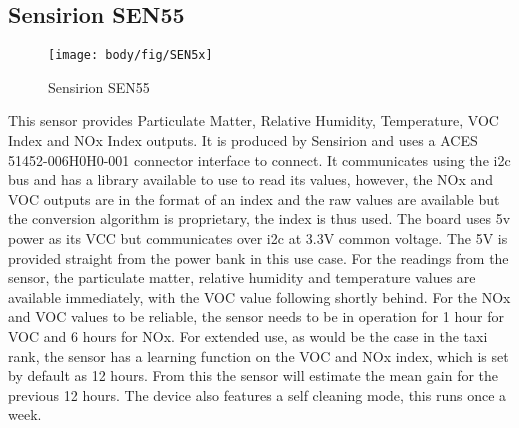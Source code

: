 \subsection{Sensirion SEN55}
\begin{figure}[!htb]
	\centering
	\texttt{[image: body/fig/SEN5x]}
	\caption{Sensirion SEN55}
	\label{fig:sen5x}
\end{figure}
\noindent
This sensor provides Particulate Matter, Relative Humidity, Temperature, VOC Index and NOx Index outputs.
It is produced by Sensirion and uses a ACES 51452-006H0H0-001 connector interface to connect. It communicates using the i2c bus and has a library available to use to read its values, however, the NOx and VOC outputs are in the format of an index and the raw values are available but the conversion algorithm is proprietary, the index is thus used. The board uses 5v power as its VCC but communicates over i2c at 3.3V common voltage. The 5V is provided straight from the power bank in this use case.
For the readings from the sensor, the particulate matter, relative humidity and temperature values are available immediately, with the VOC value following shortly behind. For the NOx and VOC values to be reliable, the sensor needs to be in operation for 1 hour for VOC and 6 hours for NOx. For extended use, as would be the case in the taxi rank, the sensor has a learning function on the VOC and NOx index, which is set by default as 12 hours. From this the sensor will estimate the mean gain for the previous 12 hours. The device also features a self cleaning mode, this runs once a week.


